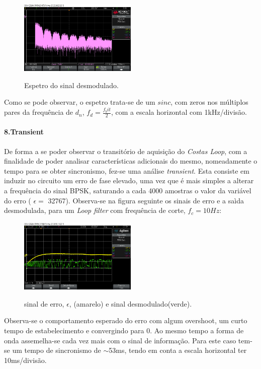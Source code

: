 \documentclass[11pt]{article}
\numberwithin{equation}{section}
\begin{document}
\begin{figure}[H]
	\centering
	\includegraphics[width=0.5\textwidth]{./espetro}~\\
	\caption{Espetro do sinal desmodulado.}
	\label{espetro}
\end{figure}

Como se pode observar, o espetro trata-se de um $sinc$, com zeros nos múltiplos pares da frequência de $d_n$, $f_d=\frac{f_bit}{2}$, com a escala horizontal com 1kHz/divisão.

\paragraph{8.Transient} \hspace{0pt}

De forma a se poder observar o transitório de aquisição do \textit{Costas Loop}, com a finalidade de poder analisar características adicionais do mesmo, nomeadamente o tempo para se obter sincronismo, fez-se uma análise \textit{transient}. Esta consiste em induzir no circuito um erro de fase elevado, uma vez que é mais simples a alterar a frequência do sinal BPSK, saturando a cada 4000 amostras o valor da variável do erro ( $\epsilon=$ 32767). Observa-se na figura seguinte os sinais de erro e a saìda desmodulada, para um \textit{Loop filter} com frequência de corte, $f_c = 10Hz$:

\begin{figure}[H]
	\centering
	\includegraphics[width=0.5\textwidth]{./transient10Hz}~\\
	\caption{sinal de erro, $\epsilon$, (amarelo) e sinal desmodulado(verde).}
	\label{trans10}
\end{figure}
Observa-se o comportamento esperado do erro com algum overshoot, um curto tempo de estabelecimento e convergindo para 0. Ao mesmo tempo a forma de onda assemelha-se cada vez mais com o sinal de informação. Para este caso tem-se um tempo de sincronismo de $\sim$53ms, tendo em conta a escala horizontal ter 10ms/divisão.
\end{document}
